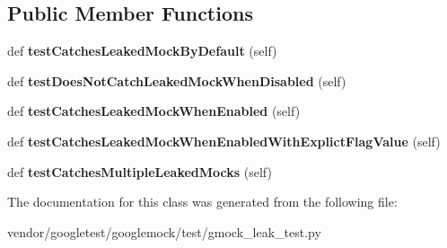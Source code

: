 \subsection*{Public Member Functions}
\begin{DoxyCompactItemize}
\item 
def {\bfseries test\+Catches\+Leaked\+Mock\+By\+Default} (self)\hypertarget{classgmock__leak__test_1_1GMockLeakTest_ad87d271de7b3f106e51272d6e9139c76}{}\label{classgmock__leak__test_1_1GMockLeakTest_ad87d271de7b3f106e51272d6e9139c76}

\item 
def {\bfseries test\+Does\+Not\+Catch\+Leaked\+Mock\+When\+Disabled} (self)\hypertarget{classgmock__leak__test_1_1GMockLeakTest_a3107bf5a603558ab2d97d88fb5589951}{}\label{classgmock__leak__test_1_1GMockLeakTest_a3107bf5a603558ab2d97d88fb5589951}

\item 
def {\bfseries test\+Catches\+Leaked\+Mock\+When\+Enabled} (self)\hypertarget{classgmock__leak__test_1_1GMockLeakTest_a78f4040a392d183597f71d92da8c1246}{}\label{classgmock__leak__test_1_1GMockLeakTest_a78f4040a392d183597f71d92da8c1246}

\item 
def {\bfseries test\+Catches\+Leaked\+Mock\+When\+Enabled\+With\+Explict\+Flag\+Value} (self)\hypertarget{classgmock__leak__test_1_1GMockLeakTest_ab19cf302ea06e1b186bd6ab951d9161e}{}\label{classgmock__leak__test_1_1GMockLeakTest_ab19cf302ea06e1b186bd6ab951d9161e}

\item 
def {\bfseries test\+Catches\+Multiple\+Leaked\+Mocks} (self)\hypertarget{classgmock__leak__test_1_1GMockLeakTest_a09465b2bfde98834e4bb9563c035f034}{}\label{classgmock__leak__test_1_1GMockLeakTest_a09465b2bfde98834e4bb9563c035f034}

\end{DoxyCompactItemize}


The documentation for this class was generated from the following file\+:\begin{DoxyCompactItemize}
\item 
vendor/googletest/googlemock/test/gmock\+\_\+leak\+\_\+test.\+py\end{DoxyCompactItemize}
